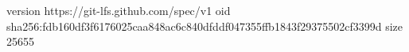 version https://git-lfs.github.com/spec/v1
oid sha256:fdb160df3f6176025caa848ac6c840dfddf047355ffb1843f29375502cf3399d
size 25655
